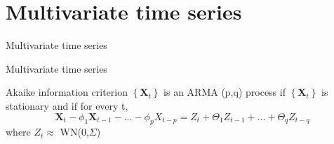 \documentclass[11pt]{beamer}
\begin{document}
\section{Multivariate time series}
\begin{frame}
\begin{center}
\Huge
Multivariate time series
\end{center}
\end{frame}

\begin{frame}{Multivariate time series \cite{brockwell2002introduction}}
\begin{alertblock}{Akaike information criterion}
$\left\lbrace \textbf{X}_{t} \right\rbrace$ is an ARMA (p,q) process if $\left\lbrace \textbf{X}_{t} \right\rbrace$ is stationary and if for every t, 
\begin{equation*}
\bm{X}_{t}-\phi_{1}\bm{X}_{t-1}-...-\phi_{p}X_{t-p}=Z_{t}+\Theta_{1}Z_{t-1}+...+\Theta_{q}Z_{t-q}
\end{equation*}
where $Z_{t}\approx$ WN(0,$\Sigma$)
\end{alertblock}
\end{frame}
\end{document}
